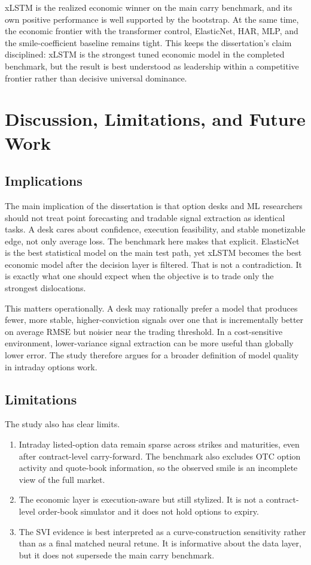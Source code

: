 \documentclass[12pt]{report}
\begin{document}
xLSTM is the realized economic winner on the main carry benchmark, and its own positive performance is well supported by the bootstrap. At the same time, the economic frontier with the transformer control, ElasticNet, HAR, MLP, and the smile-coefficient baseline remains tight. This keeps the dissertation's claim disciplined: xLSTM is the strongest tuned economic model in the completed benchmark, but the result is best understood as leadership within a competitive frontier rather than decisive universal dominance.

\chapter{Discussion, Limitations, and Future Work}

\section{Implications}
The main implication of the dissertation is that option desks and ML researchers should not treat point forecasting and tradable signal extraction as identical tasks. A desk cares about confidence, execution feasibility, and stable monetizable edge, not only average loss. The benchmark here makes that explicit. ElasticNet is the best statistical model on the main test path, yet xLSTM becomes the best economic model after the decision layer is filtered. That is not a contradiction. It is exactly what one should expect when the objective is to trade only the strongest dislocations.

This matters operationally. A desk may rationally prefer a model that produces fewer, more stable, higher-conviction signals over one that is incrementally better on average RMSE but noisier near the trading threshold. In a cost-sensitive environment, lower-variance signal extraction can be more useful than globally lower error. The study therefore argues for a broader definition of model quality in intraday options work.

\section{Limitations}
The study also has clear limits.
\begin{enumerate}[leftmargin=1.3cm]
    \item Intraday listed-option data remain sparse across strikes and maturities, even after contract-level carry-forward. The benchmark also excludes OTC option activity and quote-book information, so the observed smile is an incomplete view of the full market.
    \item The economic layer is execution-aware but still stylized. It is not a contract-level order-book simulator and it does not hold options to expiry.
    \item The SVI evidence is best interpreted as a curve-construction sensitivity rather than as a final matched neural retune. It is informative about the data layer, but it does not supersede the main carry benchmark.
\end{enumerate}
\end{document}
